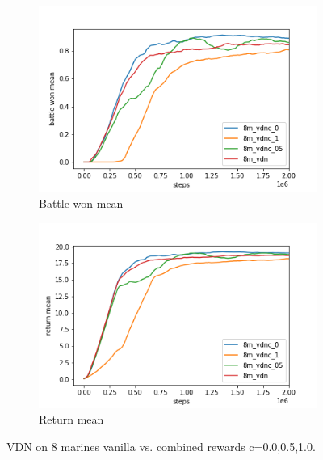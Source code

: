 
\begin{figure}[h!]
	\centering
	\begin{subfigure}[b]{0.49\textwidth}
		\includegraphics[width=\textwidth]{img/results/vdnc_8m/battle_won_mean.png}
		\caption{Battle won mean}
	\end{subfigure}
	\hfill
	\begin{subfigure}[b]{0.49\textwidth}
		\includegraphics[width=\textwidth]{img/results/vdnc_8m/return_mean.png}
		\caption{Return mean}
	\end{subfigure}
	
	\caption{VDN on 8 marines vanilla vs. combined rewards c=0.0,0.5,1.0.}
	\label{fig:vdn_8m_results}
\end{figure}

